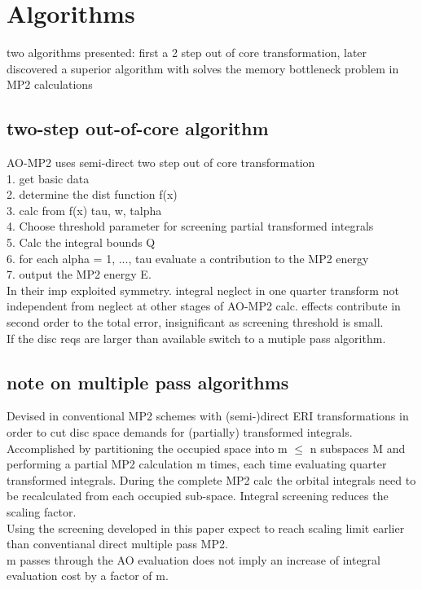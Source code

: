 \documentclass[10pt, draft]{article}
\begin{document}
\section{Algorithms}
two algorithms presented: first a 2 step out of core transformation, later discovered a superior algorithm with solves the memory bottleneck problem in MP2 calculations

\subsection{two-step out-of-core algorithm}
AO-MP2 uses semi-direct two step out of core transformation\\
1. get basic data\\
2. determine the dist function f(x)\\
3. calc from f(x) tau, w, talpha \\
4. Choose threshold parameter for screening partial transformed integrals\\
5. Calc the integral bounds Q\\
6. for each alpha = 1, ..., tau evaluate a contribution to the MP2 energy\\
7. output the MP2 energy E.\\
In their imp exploited symmetry. integral neglect in one quarter transform not independent from neglect at other stages of AO-MP2 calc.  effects contribute in second order to the total error, insignificant as screening threshold is small.\\
If the disc reqs are larger than available switch to a mutiple pass algorithm.

\subsection{note on multiple pass algorithms}
Devised in conventional MP2 schemes with (semi-)direct ERI transformations in order to cut disc space demands for (partially) transformed integrals.  Accomplished by partitioning the occupied space into m $\leq$ n subspaces M and performing a partial MP2 calculation m times, each time evaluating quarter transformed integrals.  During the complete MP2 calc the orbital integrals need to be recalculated from each occupied sub-space.  Integral screening reduces the scaling factor.\\
Using the screening developed in this paper expect to reach scaling limit earlier than conventianal direct multiple pass MP2.  \\
m passes through the AO evaluation does not imply an increase of integral evaluation cost by a factor of m.
\end{document}

